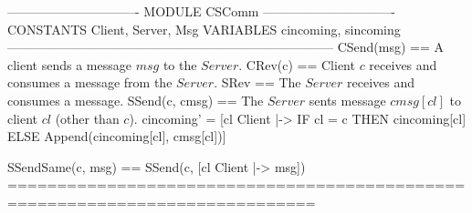 \documentclass{article}
\begin{document}
\begin{tla}
------------------------------- MODULE CSComm -------------------------------
CONSTANTS Client, Server, Msg
VARIABLES cincoming, sincoming
-----------------------------------------------------------------------------
CSend(msg) == \* A client sends a message $msg$ to the $Server$.
CRev(c) == \* Client $c$ receives and consumes a message from the $Server$.                  
SRev == \* The $Server$ receives and consumes a message.      
SSend(c, cmsg) == \* The $Server$ sents message $cmsg[cl]$ to client $cl$ (other than $c$).
    cincoming' = [cl \in Client |-> IF cl = c THEN cincoming[cl] 
                                    ELSE Append(cincoming[cl], cmsg[cl])]

SSendSame(c, msg) == SSend(c, [cl \in Client |-> msg])
=============================================================================
\end{tla}
\end{document}

